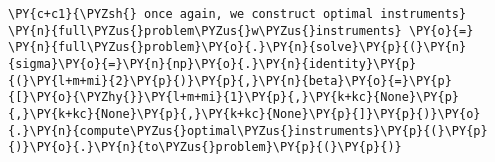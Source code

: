     \begin{tcolorbox}[breakable, size=fbox, boxrule=1pt, pad at break*=1mm,colback=cellbackground, colframe=cellborder]
\begin{Verbatim}[commandchars=\\\{\}]
\PY{c+c1}{\PYZsh{} once again, we construct optimal instruments}
\PY{n}{full\PYZus{}problem\PYZus{}w\PYZus{}instruments} \PY{o}{=} \PY{n}{full\PYZus{}problem}\PY{o}{.}\PY{n}{solve}\PY{p}{(}\PY{n}{sigma}\PY{o}{=}\PY{n}{np}\PY{o}{.}\PY{n}{identity}\PY{p}{(}\PY{l+m+mi}{2}\PY{p}{)}\PY{p}{,}\PY{n}{beta}\PY{o}{=}\PY{p}{[}\PY{o}{\PYZhy{}}\PY{l+m+mi}{1}\PY{p}{,}\PY{k+kc}{None}\PY{p}{,}\PY{k+kc}{None}\PY{p}{,}\PY{k+kc}{None}\PY{p}{]}\PY{p}{)}\PY{o}{.}\PY{n}{compute\PYZus{}optimal\PYZus{}instruments}\PY{p}{(}\PY{p}{)}\PY{o}{.}\PY{n}{to\PYZus{}problem}\PY{p}{(}\PY{p}{)}
\end{Verbatim}
\end{tcolorbox}

